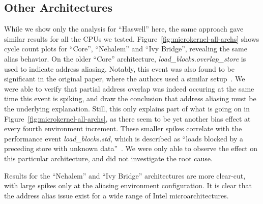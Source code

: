 \documentclass[10pt, conference, compsocconf]{IEEEtran}
\begin{document}
\subsection{Other Architectures}
While we show only the analysis for ``Haswell'' here, the same approach gave similar results for all the CPUs we tested.
Figure~\ref{fig:microkernel-all-archs} shows cycle count plots for ``Core'', ``Nehalem'' and ``Ivy Bridge'', revealing the same alias behavior.%
On the older ``Core'' architecture, \emph{load\_blocks.overlap\_store} is used to indicate address aliasing.
Notably, this event was also found to be significant in the original paper, where the authors used a similar setup~\cite{Mytkowicz:2009:WrongData}.
We were able to verify that partial address overlap was indeed occuring at the same time this event is spiking, and draw the conclusion that address aliasing must be the underlying explanation.
Still, this only explains part of what is going on in Figure~\ref{fig:microkernel-all-archs}, as there seem to be yet another bias effect at every fourth environment increment.
These smaller spikes correlate with the performance event \emph{load\_blocks.std}, which is described as ``loads blocked by a preceding store with unknown data''~\cite[Table 19-17]{Volume3B}.
We were only able to observe the effect on this particular architecture, and did not investigate the root cause.%

Results for the ``Nehalem'' and ``Ivy Bridge'' architectures are more clear-cut, with large spikes only at the aliasing environment configuration.
It is clear that the address alias issue exist for a wide range of Intel microarchitectures.

\end{document}

